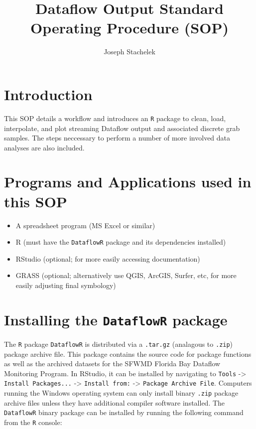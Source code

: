 \documentclass[12pt]{article}
\author{Joseph Stachelek}
\title{Dataflow Output Standard Operating Procedure (SOP)}
\begin{document}

\maketitle
\tableofcontents
 
\vspace{15pt}
\section{Introduction}

This SOP details a workflow and introduces an \texttt{R} package to clean, load, interpolate, and plot streaming Dataflow output and associated discrete grab samples. The steps neccessary to perform a number of more involved data analyses are also included.

\section{Programs and Applications used in this SOP}

\begin{itemize}
  \item A spreadsheet program (MS Excel or similar)
  \item R (must have the \texttt{DataflowR} package and its dependencies installed) 
  \item RStudio (optional; for more easily accessing documentation)
  \item GRASS (optional; alternatively use QGIS, ArcGIS, Surfer, etc, for more easily adjusting final symbology)
\end{itemize}
 
\section{Installing the \texttt{DataflowR} package}

The \texttt{R} package \texttt{DataflowR} is distributed via a \texttt{.tar.gz} (analagous to \texttt{.zip}) package archive file. This package contains the source code for package functions as well as the archived datasets for the SFWMD Florida Bay Dataflow Monitoring Program. In RStudio, it can be installed by navigating to \texttt{Tools} -> \texttt{Install Packages...} -> \texttt{Install from:} -> \texttt{Package Archive File}. Computers running the Windows operating system can only install binary \texttt{.zip} package archive files unless they have additional compiler software installed. The \texttt{DataflowR} binary package can be installed by running the following command from the \texttt{R} console:
\end{document}
